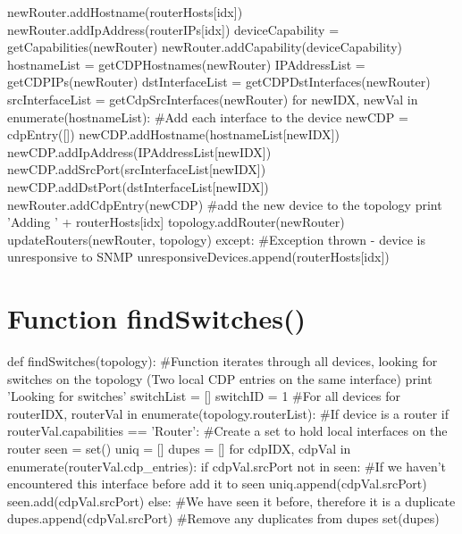 \documentclass[11pt]{report}
\begin{document}
\begin{appendices}
\begin{python}
					newRouter.addHostname(routerHosts[idx])
					newRouter.addIpAddress(routerIPs[idx])
					deviceCapability = getCapabilities(newRouter)
					newRouter.addCapability(deviceCapability)
					hostnameList = getCDPHostnames(newRouter)
					IPAddressList = getCDPIPs(newRouter)
					dstInterfaceList = getCDPDstInterfaces(newRouter)
					srcInterfaceList = getCdpSrcInterfaces(newRouter)
					for newIDX, newVal in enumerate(hostnameList):
						#Add each interface to the device
						newCDP = cdpEntry([])
						newCDP.addHostname(hostnameList[newIDX])
						newCDP.addIpAddress(IPAddressList[newIDX])
						newCDP.addSrcPort(srcInterfaceList[newIDX])
						newCDP.addDstPort(dstInterfaceList[newIDX])
						newRouter.addCdpEntry(newCDP)
					#add the new device to the topology
					print 'Adding ' + routerHosts[idx]
					topology.addRouter(newRouter)
					updateRouters(newRouter, topology)
				except:
					#Exception thrown - device is unresponsive to SNMP
					unresponsiveDevices.append(routerHosts[idx])
\end{python}

\chapter{Function findSwitches()}

\begin{python}
def findSwitches(topology):
	#Function iterates through all devices, looking for switches on the topology (Two local CDP entries on the same interface)
	print 'Looking for switches'
	switchList = []
	switchID = 1
	#For all devices
	for routerIDX, routerVal in enumerate(topology.routerList):
		#If device is a router
		if routerVal.capabilities == 'Router':
			#Create a set to hold local interfaces on the router
			seen = set()
			uniq = []
			dupes = []
			for cdpIDX, cdpVal in enumerate(routerVal.cdp_entries):
				if cdpVal.srcPort not in seen:
					#If we haven't encountered this interface before add it to seen
					uniq.append(cdpVal.srcPort)
					seen.add(cdpVal.srcPort)
				else:
					#We have seen it before, therefore it is a duplicate
					dupes.append(cdpVal.srcPort)
			#Remove any duplicates from dupes
			set(dupes)
			

\end{python}
\end{appendices}
\end{document}
